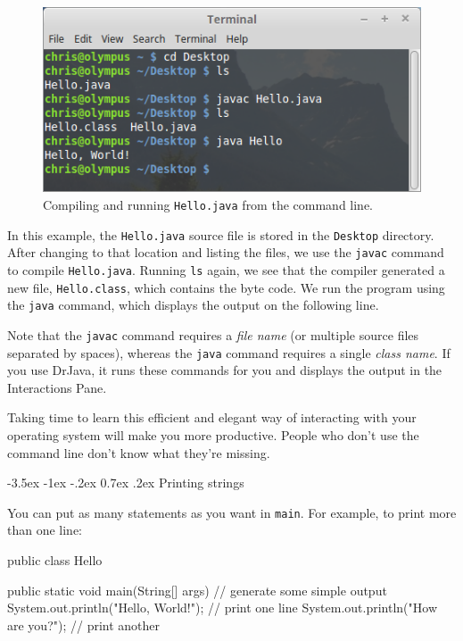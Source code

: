\documentclass[12pt]{book}
\makeatletter
\theoremstyle{exercise}
\newcommand{\java}[1]{\verb"#1"}
\renewcommand{\section}{\@startsection{section}{1}{\z@}%
    {-3.5ex \@plus -1ex \@minus -.2ex}%
    {0.7ex \@plus.2ex}%
    {\normalfont\Large\bfseries}}
\newcommand{\java}[1]{\lstinline{#1}} %
\makeatother
\begin{document}

\begin{figure}[!h]
\begin{center}
\includegraphics[width=4.5in]{figs/terminal.png}
\caption{Compiling and running {\tt Hello.java} from the command line.}
\end{center}
\end{figure}

In this example, the {\tt Hello.java} source file is stored in the {\tt Desktop} directory.
After changing to that location and listing the files, we use the {\tt javac} command to compile {\tt Hello.java}.
Running {\tt ls} again, we see that the compiler generated a new file, {\tt Hello.class}, which contains the byte code.
We run the program using the {\tt java} command, which displays the output on the following line.

Note that the {\tt javac} command requires a {\em file name} (or multiple source files separated by spaces), whereas the {\tt java} command requires a single {\em class name}.
If you use DrJava, it runs these commands for you and displays the output in the Interactions Pane.

Taking time to learn this efficient and elegant way of interacting with your operating system will make you more productive.
People who don't use the command line don't know what they're missing.



\section{Printing strings}

You can put as many statements as you want in \java{main}.
For example, to print more than one line:

\begin{code}
public class Hello {

    public static void main(String[] args) {
        // generate some simple output
        System.out.println("Hello, World!");  // print one line
        System.out.println("How are you?");   // print another
    }

}
\end{code}
\end{document}
